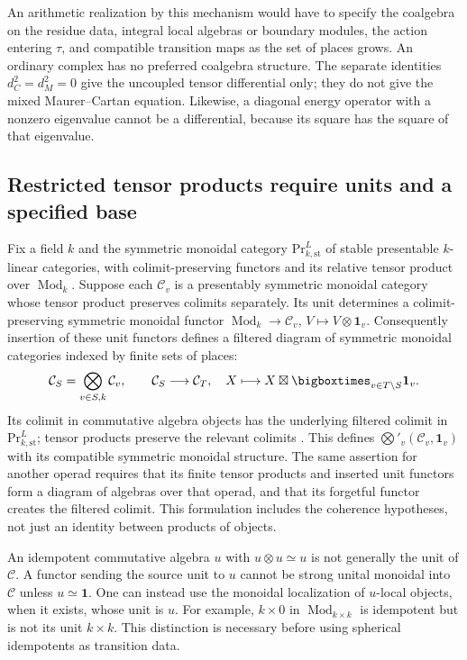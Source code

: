 An arithmetic realization by this mechanism would have to specify the
coalgebra on the residue data, integral local algebras or boundary modules,
the action entering $\tau$, and compatible transition maps as the set of
places grows.  An ordinary complex has no preferred coalgebra structure.
The separate identities $d_C^2=d_M^2=0$ give the uncoupled tensor
differential only; they do not give the mixed Maurer--Cartan equation.
Likewise, a diagonal energy operator with a nonzero eigenvalue cannot be a
differential, because its square has the square of that eigenvalue.

\subsection{Restricted tensor products require units and a specified base}
\label{syn-arith:categorical}
Fix a field $k$ and the symmetric monoidal category
$\mathrm{Pr}_{k,\mathrm{st}}^L$ of stable presentable $k$-linear categories,
with colimit-preserving functors and its relative tensor product over
$\operatorname{Mod}_k$.  Suppose each $\mathcal C_v$ is a presentably
symmetric monoidal category whose tensor product preserves colimits separately.
Its unit determines a colimit-preserving symmetric monoidal functor
$\operatorname{Mod}_k\to\mathcal C_v$, $V\mapsto V\otimes\mathbf1_v$.
Consequently insertion of these unit functors defines a filtered diagram of
symmetric monoidal categories indexed by finite sets of places:
\[
 \mathcal C_S=\bigotimes_{v\in S,k}\mathcal C_v,
 \qquad
 \mathcal C_S\longrightarrow\mathcal C_T,\quad
 X\longmapsto X\boxtimes\bigboxtimes_{v\in T\setminus S}\mathbf1_v.
\]
Its colimit in commutative algebra objects has the underlying filtered
colimit in $\mathrm{Pr}_{k,\mathrm{st}}^L$; tensor products preserve the
relevant colimits \cite[Proposition~3.2.3.1]{syn-arith:HA}.
This defines $\bigotimes'_v(\mathcal C_v,\mathbf1_v)$ with its compatible
symmetric monoidal structure.  The same assertion for another operad requires
that its finite tensor products and inserted unit functors form a diagram
of algebras over that operad, and that its forgetful functor creates the
filtered colimit.  This formulation includes the coherence hypotheses,
not just an identity between products of objects.

An idempotent commutative algebra $u$ with $u\otimes u\simeq u$ is not generally
the unit of $\mathcal C$.  A functor sending the source unit to $u$ cannot be
strong unital monoidal into $\mathcal C$ unless $u\simeq\mathbf1$.
One can instead use the monoidal localization of $u$-local objects, when it
exists, whose unit is $u$.  For example, $k\times0$ in
$\operatorname{Mod}_{k\times k}$ is idempotent but is not its unit $k\times k$.
This distinction is necessary before using spherical idempotents as
transition data.

